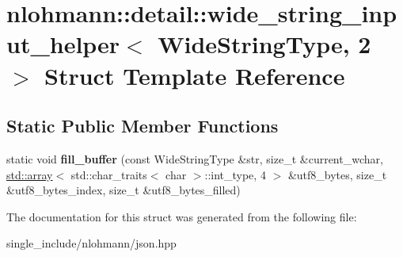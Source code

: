 \hypertarget{structnlohmann_1_1detail_1_1wide__string__input__helper_3_01WideStringType_00_012_01_4}{}\section{nlohmann\+:\+:detail\+:\+:wide\+\_\+string\+\_\+input\+\_\+helper$<$ Wide\+String\+Type, 2 $>$ Struct Template Reference}
\label{structnlohmann_1_1detail_1_1wide__string__input__helper_3_01WideStringType_00_012_01_4}
\subsection*{Static Public Member Functions}
\begin{DoxyCompactItemize}
\item 
\mbox{\label{structnlohmann_1_1detail_1_1wide__string__input__helper_3_01WideStringType_00_012_01_4_a7ede7749f186f1a6a46c08abb607fd5c}} 
static void {\bfseries fill\+\_\+buffer} (const Wide\+String\+Type \&str, size\+\_\+t \&current\+\_\+wchar, \hyperlink{namespacenlohmann_1_1detail_a1ed8fc6239da25abcaf681d30ace4985af1f713c9e000f5d3f280adbd124df4f5}{std\+::array}$<$ std\+::char\+\_\+traits$<$ char $>$\+::int\+\_\+type, 4 $>$ \&utf8\+\_\+bytes, size\+\_\+t \&utf8\+\_\+bytes\+\_\+index, size\+\_\+t \&utf8\+\_\+bytes\+\_\+filled)
\end{DoxyCompactItemize}


The documentation for this struct was generated from the following file\+:\begin{DoxyCompactItemize}
\item 
single\+\_\+include/nlohmann/json.\+hpp\end{DoxyCompactItemize}
